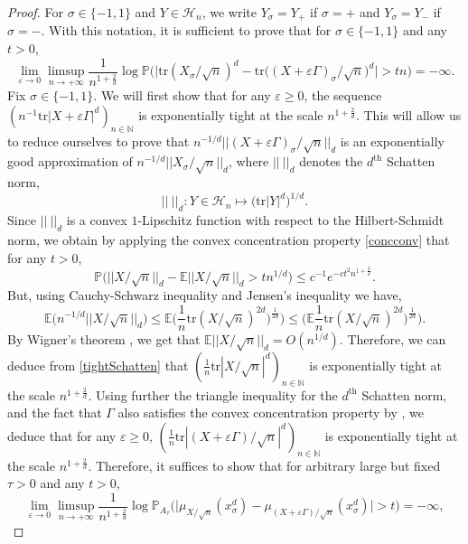 \documentclass[aop,preprint]{imsart}
\newcommand\NN{\mathbb{N}}
\newcommand\PP{\mathbb{P}}
\newcommand\EE{\mathbb{E}}
\newcommand\tr{\mathrm{tr}}
\newcommand\eps{\varepsilon}
\numberwithin{equation}{section}
\theoremstyle{definition}
\theoremstyle{plain}
\theoremstyle{remark}
\begin{document}
\begin{proof}For $\sigma \in \{-1,1\}$ and $Y\in\mathcal{H}_n$, we write $Y_{\sigma} = Y_+$ if $\sigma =+$ and $Y_{\sigma} = Y_-$ if $\sigma = -$.
With this notation, it is sufficient to prove that for $\sigma\in\{-1,1\}$ and any $t>0$,
$$ \lim_{\eps \to 0 } \limsup_{n\to +\infty} \frac{1}{n^{1+\frac{2}{d}}} \log \PP\big( \big|  \tr (X_\sigma/\sqrt{n})^d - \tr\big((X+\eps \Gamma)_\sigma/\sqrt{n}\big)^d \big|>t n \big) = - \infty.$$
Fix $\sigma \in \{-1,1\}$. 
We will first show that for any $\eps\geq 0$, the sequence $(n^{-1}\tr|X+\eps \Gamma|^d)_{n\in \NN}$ is exponentially tight at the scale $n^{1+\frac{2}{d}}$. This will allow us to reduce ourselves to prove that  $n^{-1/d}||(X+\eps\Gamma)_\sigma/\sqrt{n}||_d$ is an exponentially good approximation of $n^{-1/d}||X_\sigma/\sqrt{n}||_d$, where $||\ ||_d$ denotes the $d^{\text{th}}$ Schatten norm,
\begin{equation} \label{defSchatten} || \ ||_d :  Y\in \mathcal{H}_n \mapsto \big( \tr|Y|^d\big)^{1/d}.\end{equation}
Since $|| \ ||_d$ is a convex $1$-Lipschitz function with respect to the Hilbert-Schmidt norm, we obtain by applying the convex concentration property \ref{concconv} that for any $t>0$,
 \begin{equation} \label{tightSchatten} \PP\big (  || X/\sqrt{n} ||_d - \EE || X/\sqrt{n}||_d  > t n^{1/d} \big) \leq c^{-1}e^{- c t^2 n^{1+\frac{2}{d}}}.\end{equation}  
But, using Cauchy-Schwarz inequality and Jensen's inequality we have,
$$  \EE\big( n^{-1/d} || X/\sqrt{n}||_d \big) \leq \EE \big( \frac{1}{n} \tr (X/\sqrt{n})^{2d} \big)^{\frac{1}{2d}}\big) \leq  \big( \EE \frac{1}{n} \tr (X/\sqrt{n})^{2d} \big)^{\frac{1}{2d}}\big).$$
By Wigner's theorem \cite[Lemma 2.1.6]{AGZ}, we get that $  \EE || X/\sqrt{n}||_d  =O(n^{1/d})$. Therefore, we can deduce from \eqref{tightSchatten} that $(\frac{1}{n}\tr|X / \sqrt{n}|^d)_{n\in \NN}$ is exponentially tight at the scale $n^{1+\frac{2}{d}}$. Using further the triangle inequality for the $d^{\text{th}}$ Schatten norm, and the fact that $\Gamma$ also satisfies the convex concentration property by \cite[Theorem 5.2, 4.3]{Ledouxmono}, we deduce that for any $\eps\geq 0$, $(\frac{1}{n}\tr|(X+\eps \Gamma)/\sqrt{n}|^d)_{n\in \NN}$ is exponentially tight at the scale $n^{1+\frac{2}{d}}$. Therefore, it suffices to show that for arbitrary large but fixed $\tau>0$ and any $t>0$,
$$ \lim_{\eps \to 0 } \limsup_{n\to +\infty} \frac{1}{n^{1+\frac{2}{d}}} \log \PP_{A_\tau}\big( \big|  \mu_{X/\sqrt{n}}(x^d_\sigma)- \mu_{(X+\eps \Gamma)/\sqrt{n}}(x^d_\sigma) \big|>t \big) = - \infty,$$

\end{proof}
\end{document}
